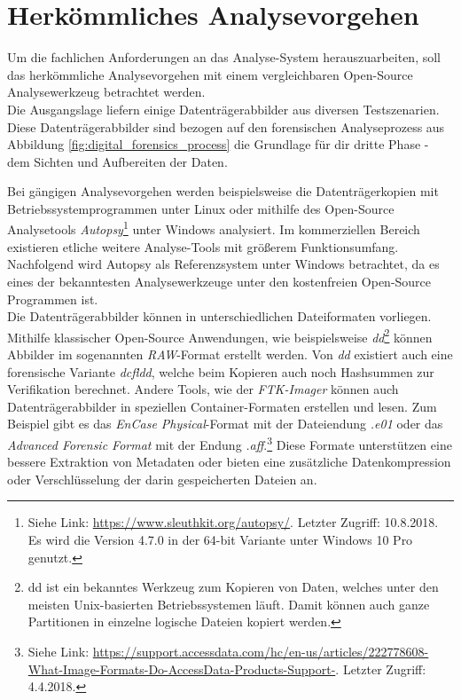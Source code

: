 \section{Herkömmliches Analysevorgehen}
\label{sec:common_analysis_approach_part1}
Um die fachlichen Anforderungen an das Analyse-System herauszuarbeiten, soll das herkömmliche Analysevorgehen mit einem vergleichbaren Open-Source Analysewerkzeug betrachtet werden.\\
Die Ausgangslage liefern einige Datenträgerabbilder aus diversen Testszenarien. Diese Datenträgerabbilder sind bezogen auf den forensischen Analyseprozess aus Abbildung \ref{fig:digital_forensics_process} die Grundlage für dir dritte Phase - dem Sichten und Aufbereiten der Daten.

\noindent
Bei gängigen Analysevorgehen werden beispielsweise die Datenträgerkopien mit Betriebssystemprogrammen unter Linux oder mithilfe des Open-Source Analysetools \textit{Autopsy}\footnote{Siehe Link: \url{https://www.sleuthkit.org/autopsy/}. Letzter Zugriff: 10.8.2018. Es wird die Version 4.7.0 in der 64-bit Variante unter Windows 10 Pro genutzt.} unter Windows analysiert. Im kommerziellen Bereich existieren etliche weitere Analyse-Tools mit größerem Funktionsumfang. Nachfolgend wird Autopsy als Referenzsystem unter Windows betrachtet, da es eines der bekanntesten Analysewerkzeuge unter den kostenfreien Open-Source Programmen ist. \\ 

\noindent
Die Datenträgerabbilder können in unterschiedlichen Dateiformaten vorliegen. Mithilfe klassischer Open-Source Anwendungen, wie beispielsweise \textit{dd}\footnote{dd ist ein bekanntes Werkzeug zum Kopieren von Daten, welches unter den meisten Unix-basierten Betriebssystemen läuft. Damit können auch ganze Partitionen in einzelne logische Dateien kopiert werden.} können Abbilder im sogenannten \textit{RAW}-Format erstellt werden. Von \textit{dd} existiert auch eine forensische Variante \textit{dcfldd}, welche beim Kopieren auch noch Hashsummen zur Verifikation berechnet.\cite{linux_forensics}  Andere Tools, wie der \textit{FTK-Imager} können auch Datenträgerabbilder in speziellen Container-Formaten erstellen und lesen. Zum Beispiel gibt es das \textit{EnCase Physical}-Format mit der Dateiendung \textit{.e01} oder das \textit{Advanced Forensic Format} mit der Endung \textit{.aff}.\footnote{Siehe Link: \url{https://support.accessdata.com/hc/en-us/articles/222778608-What-Image-Formats-Do-AccessData-Products-Support-}. Letzter Zugriff: 4.4.2018.} Diese Formate unterstützen eine bessere Extraktion von Metadaten oder bieten eine zusätzliche Datenkompression oder Verschlüsselung der darin gespeicherten Dateien an.\cite[S. 35]{digital_forensics}\\

